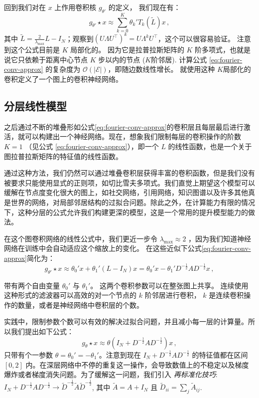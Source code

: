 \documentclass{article} %
\begin{document}
回到我们对在 $x$ 上作用卷积核 $g_{\theta'}$ 的定义， 我们现在有：
\begin{equation}
  g_{\theta'} \star x \approx  \sum_{k=0}^{K} \theta_k' T_k(\tilde{L}) x \, ,
\label{eq:fourier-conv-approx}
\end{equation}
其中 $\tilde{L} = \frac{2}{\lambda_{\text{max}}}L-I_N$；观察到$(U\Lambda U^\top)^k = U \Lambda^k U^\top$，这个可以很容易验证。 注意到这个公式目前是 $K$ 局部化的。 因为它是拉普拉斯矩阵的 $K$ 阶多项式，也就是说它只依赖于距离中心节点 $K$ 步以内的节点 ($K$阶邻居). 计算公式 \ref{eq:fourier-conv-approx} 的复杂度为 $\mathcal{O}(|\mathcal{E}|)$，即随边数线性增长。 \cite{defferrard2016convolutional} 就使用这种 $K$局部化的卷积定义了一个图上的卷积神经网络。

\subsection{分层线性模型}
\label{sec:linear-model}
之后通过不断的堆叠形如公式\ref{eq:fourier-conv-approx}的卷积层且每层最后进行激活，就可以构建出一个神经网络。现在，想象我们限制每层的卷积操作的阶数 $K=1$ （见公式 \ref{eq:fourier-conv-approx}），即一个 $L$ 的线性函数，也是一个关于图拉普拉斯矩阵的特征值的线性函数。

通过这种方法，我们仍然可以通过堆叠卷积层获得丰富的卷积函数，但是我们没有被要求只能使用显式的正则项，如切比雪夫多项式。我们直觉上期望这个模型可以缓解在节点度变化很大的图上，如社交网络，引用网络，知识图谱以及许多其他真是世界的网络，对局部邻居结构的过拟合问题。除此之外，在计算能力有限的情况下，这种分层的公式允许我们构建更深的模型，这是一个常用的提升模型能力的做法\citep{he2015deep}。

在这个图卷积网络的线性公式中，我们更近一步令 $\lambda_{\text{max}}\approx 2$ ，因为我们知道神经网络在训练中会自动适应这个缩放上的变化。 在这些近似下公式\ref{eq:fourier-conv-approx}简化为：
\begin{equation}
  g_{\theta'} \star x \approx  \theta_0' x
  + \theta_1' \left(L-I_N\right)x = \theta_0' x - \theta_1' D^{-\frac{1}{2}}AD^{-\frac{1}{2}} x \, ,
\label{eq:fourier-conv-approx2}
\end{equation}

带有两个自由变量 $\theta_0'$ 与 $\theta_1'$。 这两个卷积参数可以在整张图上共享。 连续使用这种形式的滤波器可以高效的对一个节点的 $k$ 阶邻居进行卷积， $k$ 是连续卷积操作的数量，或者是神经网络中卷积层的个数。

实践中，限制参数个数可以有效的解决过拟合问题，并且减小每一层的计算量。所以我们提出如下公式：
\begin{equation}
  g_{\theta} \star x \approx  \theta \left(I_N + D^{-\frac{1}{2}}AD^{-\frac{1}{2}}\right) x \, ,
\label{eq:fourier-conv-approx3}
\end{equation}
只带有个一参数 $\theta = \theta_0'=-\theta_1'$。注意到现在 $I_N + D^{-\frac{1}{2}}AD^{-\frac{1}{2}}$ 的特征值都在区间 $[0, 2]$ 内。在深层网络中不停的重复这一操作，会导致数值上的不稳定以及梯度爆炸或者梯度消失问题。为了缓解这一问题，我们引入 \textit{再标准化技巧}:
$I_N + D^{-\frac{1}{2}}AD^{-\frac{1}{2}}\rightarrow \tilde{D}^{-\frac{1}{2}}\tilde{A}\tilde{D}^{-\frac{1}{2}}$, 其中 $\tilde{A} = A + I_N$ 且 $\tilde{D}_{ii} = \sum_j \tilde{A}_{ij}$.
\end{document}
